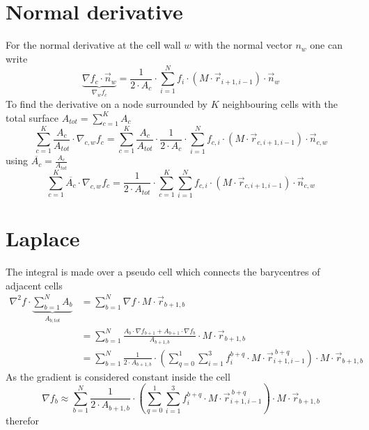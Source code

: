\section{Normal derivative}
For the normal derivative at the cell wall $w$ with the normal vector $n_w$ one can write
\begin{equation}
    \underbrace{\nabla f_c \cdot \vec{n}_w}_{\nabla_{w} f_c} = \frac{1}{2 \cdot A_c} \cdot \sum_{i = 1}^N f_i \cdot (M \cdot \vec{r}_{i + 1,i - 1}) \cdot \vec{n}_w
\end{equation}
To find the derivative on a node surrounded by $K$ neighbouring cells with the total surface $A_{tot} = \sum_{c=1}^K A_c$
\begin{equation}
    \sum_{c=1}^K \frac{A_c}{A_{tot}} \cdot \nabla_{c, w} f_c = \sum_{c=1}^K \frac{A_c}{A_{tot}} \cdot \frac{1}{2 \cdot A_c} \cdot \sum_{i = 1}^N f_{c, i} \cdot (M \cdot \vec{r}_{c, i + 1,i - 1}) \cdot \vec{n}_{c,w}
\end{equation}
using $\overline{A_c} = \frac{A_c}{A_{tot}}$
\begin{equation}
    \sum_{c=1}^K \overline{A_c} \cdot \nabla_{c, w} f_c = \frac{1}{2 \cdot A_{tot}} \cdot\sum_{c=1}^K  \sum_{i = 1}^N f_{c, i} \cdot (M \cdot \vec{r}_{c, i + 1,i - 1}) \cdot \vec{n}_{c, w}
\end{equation}

\section{Laplace}
The integral is made over a pseudo cell which connects the barycentres of adjacent cells
\begin{equation}
    \begin{split}
        \nabla^2 f \cdot \underbrace{\sum_{b=1}^N A_b}_{A_{b, tot}}  &=  \sum_{b = 1}^N \nabla f \cdot M \cdot \vec{r}_{b + 1,b} \\
        &= \sum_{b = 1}^N \frac{A_b \cdot\nabla f_{b+1} + A_{b+ 1} \cdot \nabla f_b}{A_{b+1, b}} \cdot M \cdot \vec{r}_{b + 1,b} \\
        &= \sum_{b = 1}^N \frac{1}{2 \cdot A_{b+ 1, b}} \cdot \left( \sum_{q=0}^1\sum_{i = 1}^3 f^{b + q}_{i} \cdot M \cdot \vec{r}^{\:b + q}_{i + 1,i - 1}  \right) \cdot M \cdot \vec{r}_{b + 1,b}
    \end{split}
\end{equation}
As the gradient is considered constant inside the cell
\begin{equation}
    \nabla f_b \approx \sum_{b = 1}^N \frac{1}{2 \cdot A_{b+ 1, b}} \cdot \left( \sum_{q=0}^1\sum_{i = 1}^3 f^{b + q}_{i} \cdot M \cdot \vec{r}^{\:b + q}_{i + 1,i - 1}  \right) \cdot M \cdot \vec{r}_{b + 1,b}
\end{equation}
therefor
